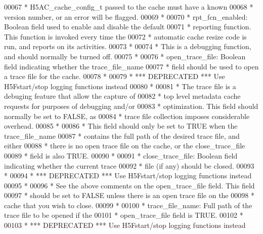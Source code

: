 \begin{DoxyCode}
00067 \textcolor{comment}{ *      H5AC\_cache\_config\_t passed to the cache must have a known}
00068 \textcolor{comment}{ *      version number, or an error will be flagged.}
00069 \textcolor{comment}{ *}
00070 \textcolor{comment}{ * rpt\_fcn\_enabled: Boolean field used to enable and disable the default}
00071 \textcolor{comment}{ *  reporting function.  This function is invoked every time the}
00072 \textcolor{comment}{ *  automatic cache resize code is run, and reports on its activities.}
00073 \textcolor{comment}{ *}
00074 \textcolor{comment}{ *  This is a debugging function, and should normally be turned off.}
00075 \textcolor{comment}{ *}
00076 \textcolor{comment}{ * open\_trace\_file: Boolean field indicating whether the trace\_file\_name}
00077 \textcolor{comment}{ *  field should be used to open a trace file for the cache.}
00078 \textcolor{comment}{ *}
00079 \textcolor{comment}{ *      *** DEPRECATED *** Use H5Fstart/stop logging functions instead}
00080 \textcolor{comment}{ *}
00081 \textcolor{comment}{ *  The trace file is a debuging feature that allow the capture of}
00082 \textcolor{comment}{ *  top level metadata cache requests for purposes of debugging and/or}
00083 \textcolor{comment}{ *  optimization.  This field should normally be set to FALSE, as}
00084 \textcolor{comment}{ *  trace file collection imposes considerable overhead.}
00085 \textcolor{comment}{ *}
00086 \textcolor{comment}{ *  This field should only be set to TRUE when the trace\_file\_name}
00087 \textcolor{comment}{ *  contains the full path of the desired trace file, and either}
00088 \textcolor{comment}{ *  there is no open trace file on the cache, or the close\_trace\_file}
00089 \textcolor{comment}{ *  field is also TRUE.}
00090 \textcolor{comment}{ *}
00091 \textcolor{comment}{ * close\_trace\_file: Boolean field indicating whether the current trace}
00092 \textcolor{comment}{ *  file (if any) should be closed.}
00093 \textcolor{comment}{ *}
00094 \textcolor{comment}{ *      *** DEPRECATED *** Use H5Fstart/stop logging functions instead}
00095 \textcolor{comment}{ *}
00096 \textcolor{comment}{ *  See the above comments on the open\_trace\_file field.  This field}
00097 \textcolor{comment}{ *  should be set to FALSE unless there is an open trace file on the}
00098 \textcolor{comment}{ *  cache that you wish to close.}
00099 \textcolor{comment}{ *}
00100 \textcolor{comment}{ * trace\_file\_name: Full path of the trace file to be opened if the}
00101 \textcolor{comment}{ *  open\_trace\_file field is TRUE.}
00102 \textcolor{comment}{ *}
00103 \textcolor{comment}{ *      *** DEPRECATED *** Use H5Fstart/stop logging functions instead}

\end{DoxyCode}
